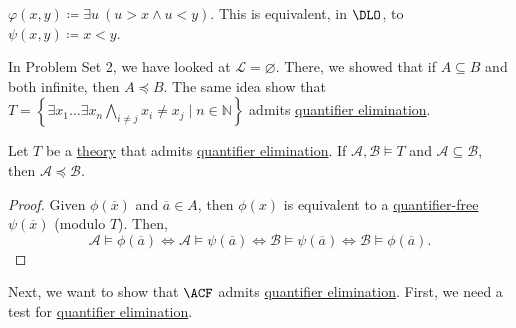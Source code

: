 \begin{eg}
	\(\varphi (x, y) \coloneqq \exists u\ (u > x \land u < y)\). This is equivalent, in \(\DLO\), to \(\psi (x, y) \coloneqq x < y\).
\end{eg}

\begin{eg}
	In Problem Set 2, we have looked at \(\mathcal{L} = \varnothing \). There, we showed that if \(A \subseteq B\) and both infinite, then \(A \preceq B\). The same idea show that \(T = \left\{ \exists x_1 \dots \exists x_{n} \bigwedge_{i\neq j} x_i \neq x_j \mid n \in \mathbb{N} \right\} \) admits \hyperref[def:quantifier-elimination]{quantifier elimination}.
\end{eg}

\begin{proposition}
	Let \(T\) be a \hyperref[def:theory]{theory} that admits \hyperref[def:quantifier-elimination]{quantifier elimination}. If \(\mathcal{A}, \mathcal{B} \models T\) and \(\mathcal{A} \subseteq \mathcal{B} \), then \(\mathcal{A} \preceq \mathcal{B} \).
\end{proposition}
\begin{proof}
	Given \(\phi (\overline{x} )\) and \(\overline{a} \in A\), then \(\phi (x)\) is equivalent to a \hyperref[not:quantifier-free]{quantifier-free} \(\psi (\overline{x} )\) (modulo \(T\)). Then,
	\[
		\mathcal{A} \models \phi (\overline{a} )
		\iff \mathcal{A} \models \psi (\overline{a} )
		\iff \mathcal{B} \models \psi (\overline{a} )
		\iff \mathcal{B} \models \phi (\overline{a} ).
	\]
\end{proof}

Next, we want to show that \(\ACF\) admits \hyperref[def:quantifier-elimination]{quantifier elimination}. First, we need a test for \hyperref[def:quantifier-elimination]{quantifier elimination}.

